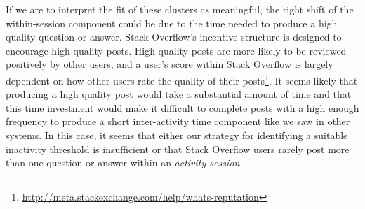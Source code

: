 If we are to interpret the fit of these clusters as meaningful, the right shift of the within-session component could be due to the time needed to produce a high quality question or answer.  Stack Overflow's incentive structure is designed to encourage high quality posts.  High quality posts are more likely to be reviewed positively by other users, and a user's score within Stack Overflow is largely dependent on how other users rate the quality of their posts\footnote{\url{http://meta.stackexchange.com/help/whats-reputation}}.  It seems likely that producing a high quality post would take a substantial amount of time and that this time investment would make it difficult to complete posts with a high enough frequency to produce a short inter-activity time component like we saw in other systems.  In this case, it seems that either our strategy for identifying a suitable inactivity threshold is insufficient or that Stack Overflow users rarely post more than one question or answer within an \emph{activity session}.
